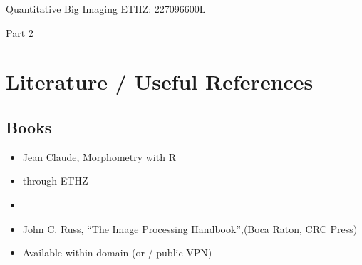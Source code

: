 \documentclass[letterpaper,10pt,english]{sphinxmanual}
\begin{document}
\sphinxAtStartPar
Quantitative Big Imaging ETHZ: 227\sphinxhyphen{}0966\sphinxhyphen{}00L


\sphinxAtStartPar
Part 2






\section{Literature / Useful References}
\label{\detokenize{06-AdvancedShapeAndTexture:literature-useful-references}}

\subsection{Books}
\label{\detokenize{06-AdvancedShapeAndTexture:books}}\begin{itemize}
\item {} 
\sphinxAtStartPar
Jean Claude, Morphometry with R

\item {} 
\sphinxAtStartPar
{} through ETHZ

\item {} 
\sphinxAtStartPar
{}

\item {} 
\sphinxAtStartPar
John C. Russ, “The Image Processing Handbook”,(Boca Raton, CRC Press)

\item {} 
\sphinxAtStartPar
Available  within domain  (or  / public VPN)

\end{itemize}
\end{document}
